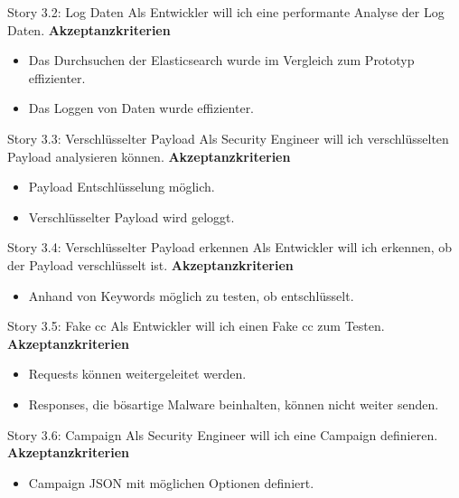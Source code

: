 \begin{story}{Story 3.2:  Log Daten}
  Als Entwickler will ich eine performante Analyse der Log Daten.
  \tcblower
  \textbf{Akzeptanzkriterien}
  \begin{itemize}
  	\item Das Durchsuchen der Elasticsearch wurde im Vergleich zum Prototyp effizienter.
  	\item Das Loggen von Daten wurde effizienter.
  \end{itemize}
\end{story}

\begin{story}{Story 3.3:  Verschlüsselter Payload}
  Als Security Engineer will ich verschlüsselten Payload analysieren können.
  \tcblower
  \textbf{Akzeptanzkriterien}
  \begin{itemize}
  	\item Payload Entschlüsselung möglich.
  	\item Verschlüsselter Payload wird geloggt.
  \end{itemize}
\end{story}

\begin{story}{Story 3.4:  Verschlüsselter Payload erkennen}
  Als Entwickler will ich erkennen, ob der Payload verschlüsselt ist.
  \tcblower
  \textbf{Akzeptanzkriterien}
  \begin{itemize}
  	\item Anhand von Keywords möglich zu testen, ob entschlüsselt.
  \end{itemize}
\end{story}

\begin{story}{Story 3.5: Fake \gls{cc}}
  Als Entwickler will ich einen Fake \gls{cc} zum Testen.
  \tcblower
  \textbf{Akzeptanzkriterien}
  \begin{itemize}
  	\item Requests können weitergeleitet werden.
  	\item Responses, die bösartige Malware beinhalten, können nicht weiter senden.
  \end{itemize}
\end{story}

\begin{story}{Story 3.6:  Campaign}
  Als Security Engineer will ich eine Campaign definieren.
  \tcblower
  \textbf{Akzeptanzkriterien}
  \begin{itemize}
  	\item Campaign JSON mit möglichen Optionen definiert.
  \end{itemize}
\end{story}


